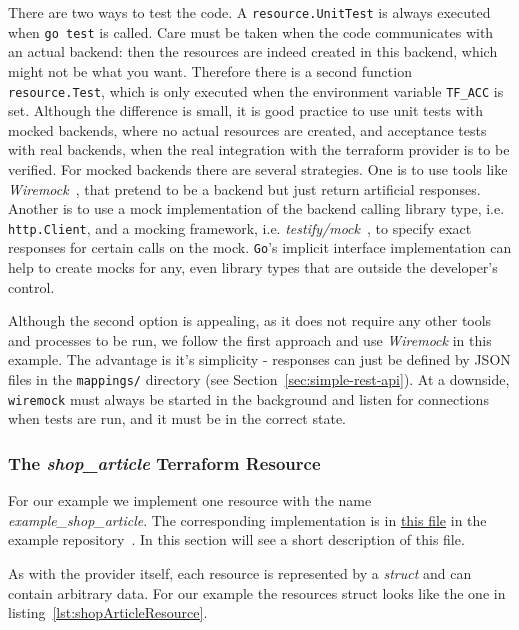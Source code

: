 \documentclass[paper=a4,11pt,numbers=noenddot]{article}
\begin{document}
There are two ways to test the code. A \verb'resource.UnitTest' is always executed when \verb'go test' is called. Care must be taken when the code communicates with an actual backend: then the resources are indeed created in this backend, which might not be what you want. Therefore there is a second function \verb'resource.Test', which is only executed when the environment variable \verb'TF_ACC' is set. Although the difference is small, it is good practice to use unit tests with mocked backends, where no actual resources are created, and acceptance tests with real backends, when the real integration with the terraform provider is to be verified. For mocked backends there are several strategies. One is to use tools like \emph{Wiremock}~\autocite{noauthor_wiremock_nodate}, that pretend to be a backend but just return artificial responses. Another is to use a mock implementation of the backend calling library type, i.e. \verb'http.Client', and a mocking framework, i.e. \emph{testify/mock}~\autocite{noauthor_testifymock_nodate}, to specify exact responses for certain calls on the mock. \verb'Go''s implicit interface implementation can help to create mocks for any, even library types that are outside the developer's control.

Although the second option is appealing, as it does not require any other tools and processes to be run, we follow the first approach and use \emph{Wiremock} in this example. The advantage is it's simplicity - responses can just be defined by JSON files in the \verb'mappings/' directory (see Section~\ref{sec:simple-rest-api}). At a downside, \verb'wiremock' must always be started in the background and listen for connections when tests are run, and it must be in the correct state.

\subsubsection{The \emph{shop\_article} Terraform Resource}
\label{subsec:emphsh-reso}

For our example we implement one resource with the name \emph{example\_shop\_article}. The corresponding implementation is in \href{https://github.com/ecky-l/terraform-provider-example/blob/main/src/tfp-example/example/shop_article_resource.go}{this file} in the example repository~\autocite{ecky-l_terraform-provider-example_nodate}. In this section will see a short description of this file.

As with the provider itself, each resource is represented by a \emph{struct} and can contain arbitrary data. For our example the resources struct looks like the one in listing~\ref{lst:shopArticleResource}.
\end{document}
